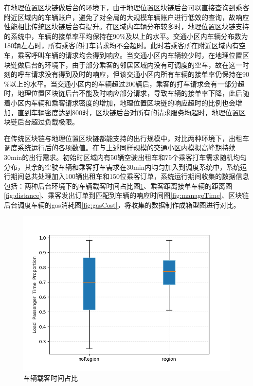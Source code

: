 ​在地理位置区块链做后台的环境下，由于地理位置区块链后台可以直接查询到乘客附近区域内的车辆账户，避免了对全局的大规模车辆账户进行低效的查询，故响应性能相比传统区块链后台有提升。在区域内车辆分布较多时，地理位置区块链支持的系统中，车辆的接单率平均保持在90$\%$及以上的水平。交通小区内车辆分布数为180辆左右时，所有乘客的打车请求均不会超时。此时若乘客所在附近区域内有空车，乘客呼叫车辆的请求均会得到响应。当交通小区内车辆较少时，在地理位置区块链做后台的环境下，由于部分乘客的邻居区域内没有可调度的空车，故在这一时刻的呼车请求没有得到及时的响应，但该交通小区内所有车辆的接单率仍保持在90$\%$以上的水平。当交通小区内的车辆超过200辆后，乘客的打车请求会有一部分超时，地理位置区块链后台不能及时响应部分请求，导致车辆的接单率下降，此后随着小区内车辆和乘客请求密度的增加，地理位置区块链的响应超时的比例也会增加，直到车辆密度达到800时，区块链后台对所有的请求服务均超时，地理位置区块链后台超过负载极限。

在传统区块链与地理位置区块链都能支持的出行规模中，对比两种环境下，出租车调度系统运行后的各项数值。在与上述同样规模的交通小区内模拟高峰期持续30min的出行需求。初始时区域内有50辆空驶出租车和75个乘客打车需求随机均匀分布，其余的空驶车辆和乘客打车需求在30min内均匀加入到调度系统中，系统运行期间总共处理加入100辆出租车和150位乘客订单，系统运行期间收集的数据信息包括：两种后台环境下的车辆载客时间占比图\ref{fig:loadPropotion}、乘客距离接单车辆的距离图\ref{fig:distance}、乘客发出订单到匹配到车辆的响应时间图\ref{fig:manageTime}、区块链后台调度车辆的gas消耗图\ref{fig:gasCost}，将收集的数据制作成箱型图进行对比。

\begin{figure}
  \centering
  \includegraphics[width=1.0\textwidth]{figures/loadPropotion}
  \caption{车辆载客时间占比}\label{fig:loadPropotion}
\end{figure}

